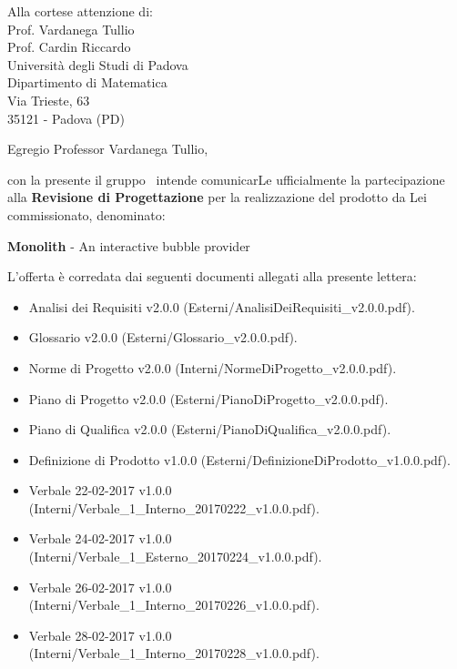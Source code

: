

\newcommand{\logo}{../../Template/Logo/Logo.png}
\newcommand{\data}{\today}
\newcommand{\oggetto}{Partecipazione alla Revisione di Progettazione.}
\newcommand{\mittente}{Francesco Bazzerla \\ Responsabile NPE Developers}
\newcommand{\firma}{../../Template/Firme/FB.png}





\begin{letter}{Alla cortese attenzione di:  \\
 Prof. Vardanega Tullio \\
 Prof. Cardin Riccardo \\
 Università degli Studi di Padova \\
 Dipartimento di Matematica \\
 Via Trieste, 63 \\
 35121 - Padova (PD)}

\opening{Egregio Professor Vardanega Tullio,} 

con la presente il gruppo \gruppo\ intende comunicarLe ufficialmente la partecipazione alla \textbf{Revisione di Progettazione} per la realizzazione del prodotto da Lei commissionato, denominato:
\begin{center}
\textbf{Monolith} - An interactive bubble provider
\end{center}
L'offerta è corredata dai seguenti documenti allegati alla presente lettera:
\begin{itemize}
	\item Analisi dei Requisiti v2.0.0 (Esterni/AnalisiDeiRequisiti\_v2.0.0.pdf).
	\item Glossario v2.0.0 (Esterni/Glossario\_v2.0.0.pdf).
	\item Norme di Progetto v2.0.0 (Interni/NormeDiProgetto\_v2.0.0.pdf).
	\item Piano di Progetto v2.0.0 (Esterni/PianoDiProgetto\_v2.0.0.pdf).
	\item Piano di Qualifica v2.0.0 (Esterni/PianoDiQualifica\_v2.0.0.pdf).
	\item Definizione di Prodotto v1.0.0 (Esterni/DefinizioneDiProdotto\_v1.0.0.pdf).
	\item Verbale 22-02-2017 v1.0.0 (Interni/Verbale\_1\_Interno\_20170222\_v1.0.0.pdf).
	\item Verbale 24-02-2017 v1.0.0 (Interni/Verbale\_1\_Esterno\_20170224\_v1.0.0.pdf).
	\item Verbale 26-02-2017 v1.0.0 (Interni/Verbale\_1\_Interno\_20170226\_v1.0.0.pdf).
	\item Verbale 28-02-2017 v1.0.0 (Interni/Verbale\_1\_Interno\_20170228\_v1.0.0.pdf).
\end{itemize}


\end{letter}
